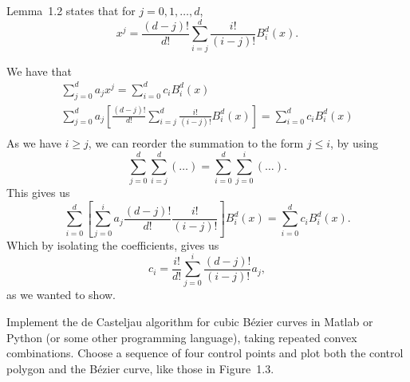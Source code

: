 \begin{solution}
    Lemma~1.2 states that for $j = 0, 1, \ldots, d$,
    \begin{equation*}
        x^j = \frac{(d - j)!}{d!} \sum_{i = j}^d \frac{i!}{(i - j)!} B_i^d(x).
    \end{equation*}

    We have that
    \begin{gather*}
        \sum_{j = 0}^d a_j x^j = \sum_{i = 0}^d c_i B_i^d(x) \\
        \sum_{j = 0}^d a_j \left[
            \frac{(d - j)!}{d!} \sum_{i = j}^d \frac{i!}{(i - j)!} B_i^d(x)
        \right]
        = \sum_{i = 0}^d c_i B_i^d(x) \\
    \end{gather*}
    As we have $i \geq j$, we can reorder the summation to the form $j \leq i$, by using
    \begin{equation*}
        \sum_{j = 0}^d \sum_{i = j}^d (\ldots) = \sum_{i = 0}^d \sum_{j = 0}^i (\ldots).
    \end{equation*}
    This gives us
    \begin{equation*}
        \sum_{i = 0}^d \left[
            \sum_{j = 0}^i a_j \frac{(d - j)!}{d!} \frac{i!}{(i - j)!}
        \right] B_i^d(x) = \sum_{i = 0}^d c_i B_i^d(x).
    \end{equation*}
    Which by isolating the coefficients, gives us
    \begin{equation*}
        c_i = \frac{i!}{d!} \sum_{j = 0}^i \frac{(d - j)!}{(i - j)!} a_j,
    \end{equation*}
    as we wanted to show.
\end{solution}

\begin{exercise}
    Implement the de Casteljau algorithm for cubic Bézier curves in Matlab or Python (or some other programming language), taking repeated convex combinations.
    Choose a sequence of four control points and plot both the control polygon and the Bézier curve, like those in Figure~1.3.
\end{exercise}

